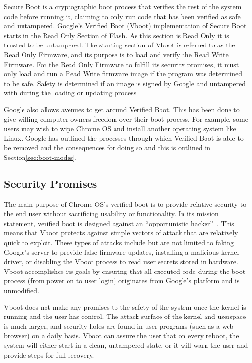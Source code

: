 \documentclass[../report.tex]{subfiles}
\begin{document}
\onehalfspacing

\newpage
{}

Secure Boot is a cryptographic boot process that verifies the rest of the system code before running it, claiming to only run code that has been verified as safe and untampered.
Google's Verified Boot (Vboot) implementation of Secure Boot starts in the Read Only Section of Flash. 
As this section is Read Only it is trusted to be untampered.
The starting section of Vboot is referred to as the Read Only Firmware, and its purpose is to load and verify the Read Write Firmware.
For the Read Only Firmware to fulfill its security promises, it must only load and run a Read Write firmware image if the program was determined to be safe.
Safety is determined if an image is signed by Google and untampered with during the loading or updating process.

Google also allows avenues to get around Verified Boot.
This has been done to give willing computer owners freedom over their boot process.
For example, some users may wish to wipe Chrome OS and install another operating system like Linux.
Google has outlined the processes through which Verified Boot is able to be removed and the consequences for doing so and this is outlined in Section\ref{sec:boot-modes}.


\subsection{Security Promises}

The main purpose of Chrome OS's verified boot is to provide relative security to the end user without sacrificing usability or functionality. 
In its mission statement, verified boot is designed against an ``opportunistic hacker''~\cite{vboot-design-doc}.
This means that Vboot protects against simple vectors of attack that are relatively quick to exploit.
These types of attacks include but are not limited to faking Google's server to provide false firmware updates, installing a malicious kernel driver, or disabling the Vboot process to read user secrets stored in hardware.
Vboot accomplishes its goals by ensuring that all executed code during the boot process (from power on to user login) originates from Google's platform and is unmodified. 

Vboot does not make any promises to the safety of the system once the kernel is running and the user has control. 
The attack surface of the kernel and userspace is much larger, and security holes are found in user programs (such as a web browser) on a daily basis.
Vboot can assure the user that on every reboot, the system will either start in a clean, untampered state, or it will warn the user and provide steps for full recovery.
\end{document}
